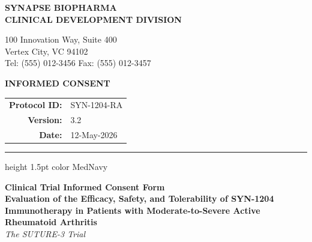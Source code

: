 \documentclass[11pt,a4paper]{article}
\begin{document}
\noindent
\begin{minipage}[t]{0.7\textwidth}
    {\selectfont\bfseries\Large\color{MedNavy} SYNAPSE BIOPHARMA} \\
    {\selectfont\bfseries\small\color{MedTeal} CLINICAL DEVELOPMENT DIVISION} \\
    \vspace{0.1cm}
    \begin{small}
        \color{MedGray}
        100 Innovation Way, Suite 400 \\
        Vertex City, VC 94102 \\
        Tel: (555) 012-3456 \quad Fax: (555) 012-3457
    \end{small}
\end{minipage}
\begin{minipage}[t]{0.3\textwidth}
    \raggedleft
    \vspace{0.1cm}
    {\selectfont\bfseries\large\color{MedNavy} INFORMED CONSENT} \\
    \vspace{0.2cm}
    \begin{tabular}{rl}
        \textbf{Protocol ID:} & SYN-1204-RA \\
        \textbf{Version:}     & 3.2 \\
        \textbf{Date:}        & 12-May-2026
    \end{tabular}
\end{minipage}

\vspace{0.4cm}
\hrule height 1.5pt color MedNavy
\vspace{0.5cm}

\begin{center}
    {\LARGE\bfseries\color{MedNavy} Clinical Trial Informed Consent Form} \\[0.2cm]
    {\large\bfseries\color{MedGray} Evaluation of the Efficacy, Safety, and Tolerability of SYN-1204 Immunotherapy in Patients with Moderate-to-Severe Active Rheumatoid Arthritis} \\[0.1cm]
    {\normalsize\itshape\color{MedTeal} The SUTURE-3 Trial}
\end{center}

\vspace{0.4cm}
\end{document}
